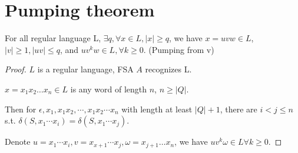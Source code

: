 \section{Pumping theorem}

\begin{lemma}
For all regular language L, \(\exists q, \forall x \in L, |x| \ge q\),
we have \(x = uvw\in L\), \(|v|\ge 1, |uv| \le q\), and
\(uv^kw\in L, \forall k \ge 0\). (Pumping from v)
\end{lemma}
\begin{proof}

\(L\) is a regular language, FSA \(A\) recognizes L.

\(x = x_1x_2\dots x_n \in L\) is any word of length \(n\), \(n \ge |Q|\).

Then for \(\epsilon, x_1, x_1x_2, \cdots, x_1x_2\cdots x_n\) with length
at least \(|Q|+1\), there are \(i < j \le n\) s.t.
\(\delta(S, x_1\cdots x_i) = \delta(S, x_1\cdots x_j)\).

Denote
\(u = x_1\cdots x_i, v = x_{x+1}\cdots x_j, \omega = x_{j+1}\dots x_n\),
we have \(uv^k\omega \in L \forall k \ge 0\).

\end{proof}